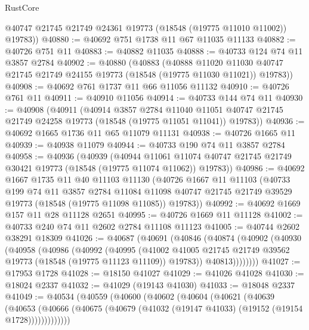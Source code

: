 \begin{lexlean}{RustCore}
\begin{coremodule}
        @40747
        @21745
        @21749
        @24361
        @19773
        (@18548 (@19775 @11010 @11002))
        @19783))
@40880 := @40692 @751 @1738 @11 @67 @11035 @11133
@40882 := @40726 @751 @11
@40883 := @40882 @11035
@40888 := @40733 @124 @74 @11 @3857 @2784
@40902 := @40880
    (@40883
      (@40888
        @11020
        @11030
        @40747
        @21745
        @21749
        @24155
        @19773
        (@18548 (@19775 @11030 @11021))
        @19783))
@40908 := @40692 @761 @1737 @11 @66 @11056 @11132
@40910 := @40726 @761 @11
@40911 := @40910 @11056
@40914 := @40733 @144 @74 @11
@40930 := @40908
    (@40911
      (@40914
        @3857
        @2784
        @11040
        @11051
        @40747
        @21745
        @21749
        @24258
        @19773
        (@18548 (@19775 @11051 @11041))
        @19783))
@40936 := @40692 @1665 @1736 @11 @65 @11079 @11131
@40938 := @40726 @1665 @11
@40939 := @40938 @11079
@40944 := @40733 @190 @74 @11 @3857 @2784
@40958 := @40936
    (@40939
      (@40944
        @11061
        @11074
        @40747
        @21745
        @21749
        @30421
        @19773
        (@18548 (@19775 @11074 @11062))
        @19783))
@40986 := @40692
    @1667
    @1735
    @11
    @40
    @11103
    @11130
    (@40726
      @1667
      @11
      @11103
      (@40733
        @199
        @74
        @11
        @3857
        @2784
        @11084
        @11098
        @40747
        @21745
        @21749
        @39529
        @19773
        (@18548 (@19775 @11098 @11085))
        @19783))
@40992 := @40692 @1669 @157 @11 @28 @11128 @2651
@40995 := @40726 @1669 @11 @11128
@41002 := @40733 @240 @74 @11 @2602 @2784 @11108 @11123
@41005 := @40744 @2602 @38291 @18309
@41026 := @40687
    (@40691
      (@40846
        (@40874
          (@40902
            (@40930
              (@40958
                (@40986
                  (@40992
                    (@40995
                      (@41002
                        @41005
                        @21745
                        @21749
                        @39562
                        @19773
                        (@18548 (@19775 @11123 @11109))
                        @19783))
                    @40813))))))))
@41027 := @17953 @1728
@41028 := @18150 @41027
@41029 := @41026 @41028
@41030 := @18024 @2337
@41032 := @41029 (@19143 @41030)
@41033 := @18048 @2337
@41049 := @40534
    (@40559
      (@40600
        (@40602
          (@40604
            (@40621
              (@40639
                (@40653
                  (@40666 (@40675 (@40679 (@41032 (@19147 @41033) (@19152 (@19154 @1728)))))))))))))

\end{coremodule}
\end{lexlean}
